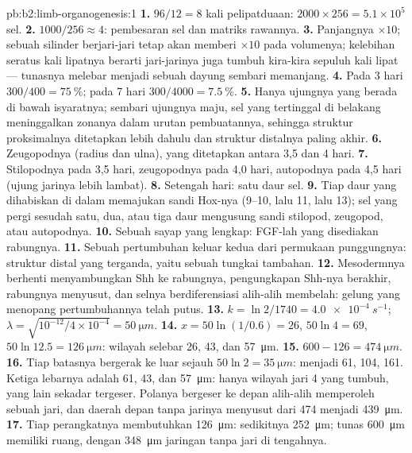 \begin{solution}{pb:b2:limb-organogenesis:1}
\textbf{1.} $96/12 = 8$ kali pelipatduaan: $2000\times 256 = 5.1\times 10^{5}$ sel.
\textbf{2.} $1000/256 \approx 4$: pembesaran sel dan matriks rawannya.
\textbf{3.} Panjangnya $\times 10$; sebuah silinder berjari-jari tetap
akan memberi $\times 10$ pada volumenya; kelebihan seratus kali
lipatnya berarti jari-jarinya juga tumbuh kira-kira sepuluh kali lipat
--- tunasnya melebar menjadi sebuah dayung sembari memanjang.
\textbf{4.} Pada 3 hari $300/400 = \qty{75}{\%}$; pada 7 hari
$300/4000 =
\qty{7.5}{\%}$.
\textbf{5.} Hanya ujungnya yang berada di bawah isyaratnya; sembari
ujungnya maju, sel yang tertinggal di belakang meninggalkan zonanya
dalam urutan pembuatannya, sehingga struktur proksimalnya ditetapkan
lebih dahulu dan struktur distalnya paling akhir.
\textbf{6.} Zeugopodnya (radius dan ulna), yang ditetapkan antara 3,5
dan 4 hari.
\textbf{7.} Stilopodnya pada 3,5 hari, zeugopodnya pada 4,0 hari,
autopodnya pada 4,5 hari (ujung jarinya lebih lambat).
\textbf{8.} Setengah hari: satu daur sel.
\textbf{9.} Tiap daur yang dihabiskan di dalam 
memajukan sandi Hox-nya (9--10, lalu 11, lalu 13); sel yang pergi
sesudah satu, dua, atau tiga daur mengusung sandi stilopod, zeugopod,
atau autopodnya.
\textbf{10.} Sebuah sayap yang lengkap: FGF-lah yang disediakan
rabungnya.
\textbf{11.} Sebuah pertumbuhan keluar kedua dari permukaan
punggungnya: struktur distal yang terganda, yaitu sebuah tungkai
tambahan.
\textbf{12.} Mesodermnya berhenti menyambungkan Shh ke rabungnya,
pengungkapan Shh-nya berakhir, rabungnya menyusut, dan selnya
berdiferensiasi alih-alih membelah: gelung yang menopang
pertumbuhannya telah putus.
\textbf{13.} $k = \ln 2/1740 = \qty{4.0e-4}{s^{-1}}$; $\lambda =
\sqrt{10^{-12}/4\times 10^{-4}} = \qty{50}{\micro m}$.
\textbf{14.} $x = 50\ln(1/0.6) = 26$, $50\ln 4 = 69$, $50\ln 12.5 =
\qty{126}{\micro m}$: wilayah selebar 26, 43, dan \qty{57}{\micro m}.
\textbf{15.} $600 - 126 = \qty{474}{\micro m}$.
\textbf{16.} Tiap batasnya bergerak ke luar sejauh $50\ln 2 = \qty{35}{\micro
m}$: menjadi 61, 104, 161. Ketiga lebarnya adalah 61, 43, dan \qty{57}{\micro m}:
hanya wilayah jari 4 yang tumbuh, yang lain sekadar tergeser.
Polanya bergeser ke depan alih-alih memperoleh sebuah jari, dan
daerah depan tanpa jarinya menyusut dari 474 menjadi \qty{439}{\micro m}.
\textbf{17.} Tiap perangkatnya membutuhkan \qty{126}{\micro m}:
sedikitnya \qty{252}{\micro m}; tunas \qty{600}{\micro m} memiliki
ruang, dengan \qty{348}{\micro m} jaringan tanpa jari di tengahnya.

\end{solution}
